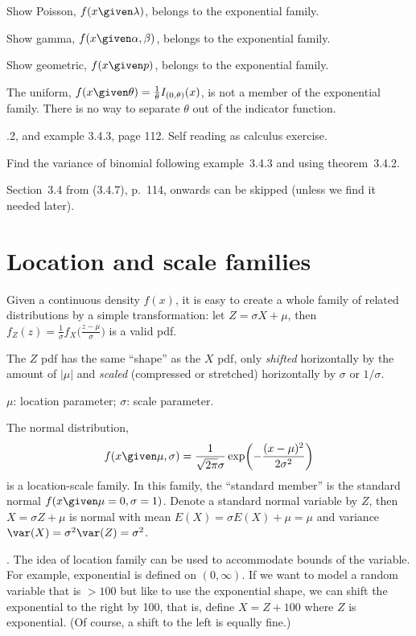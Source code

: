\documentclass[12pt]{article}
\begin{document}
\example Show Poisson, $f(x \given \lambda)$, belongs to the exponential
family.

\example Show gamma, $f(x \given \alpha, \beta)$,
belongs to the exponential family.

\exercise Show geometric, $f(x \given p)$,
belongs to the exponential family.

\example The uniform,
$f(x \given \theta) = \frac{1}{\theta} I_{(0,\theta)}(x)$,
is not a member of the exponential family.
There is no way to separate $\theta$ out of the indicator function.


.2, and example 3.4.3, page 112. Self reading
    as calculus exercise.

\exercise Find the variance of binomial following example~3.4.3 and
using theorem~3.4.2.

Section~3.4 from (3.4.7), p.~114, onwards can be skipped (unless we find
it needed later).

\section{Location and scale families}

Given a continuous density $f(x)$, it is easy to create a whole family
of related distributions by a simple transformation:
let $Z = \sigma X + \mu$, then
$f_Z(z) = \frac{1}{\sigma}f_X\bigl(\frac{z - \mu}{\sigma}\bigr)$ is a valid pdf.

The $Z$ pdf has the same ``shape'' as the $X$ pdf,
only \emph{shifted} horizontally by the amount of $|\mu|$
and \emph{scaled} (compressed or stretched) horizontally by
$\sigma$ or $1/\sigma$.

$\mu$: location parameter; $\sigma$: scale parameter.

\example
The normal distribution,
\[
f(x\given \mu, \sigma) = \frac{1}{\sqrt{2\pi}\sigma}
\exp\biggl(-\frac{(x-\mu)^2}{2\sigma^2}\biggr)
\]
is a location-scale family.
In this family, the ``standard member''
is the standard normal $f(x \given \mu=0, \sigma=1)$.
Denote a standard normal variable by $Z$,
then $X = \sigma Z + \mu$ is normal with mean
$E(X) = \sigma E(X) + \mu = \mu$ and variance
$\var(X) = \sigma^2 \var(Z) = \sigma^2$.

. The idea of location family can be used to accommodate bounds of the
variable. For example, exponential is defined on $(0, \infty)$.
If we want to model a random variable that is $>100$ but like to use the
exponential shape, we can shift the exponential to the right by 100,
that is, define
$X = Z + 100$ where $Z$ is exponential.
(Of course, a shift to the left is equally fine.)
\end{document}
